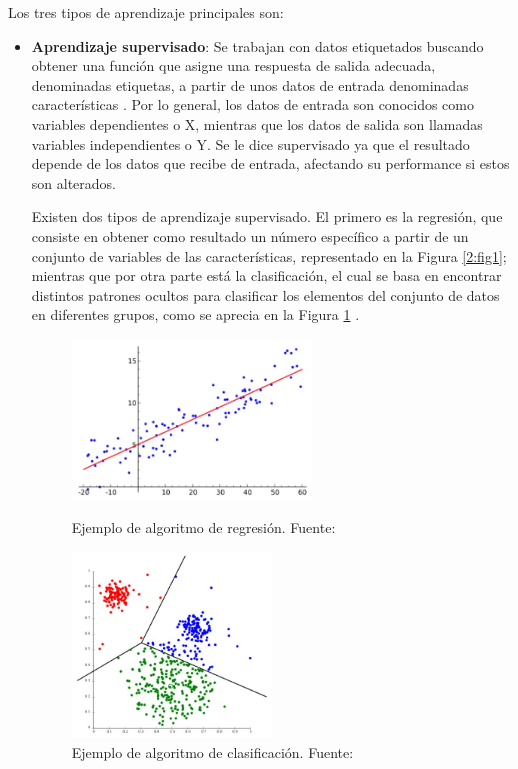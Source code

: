 Los tres tipos de aprendizaje principales son:
\begin{itemize}
	\item \textbf{Aprendizaje supervisado}: Se trabajan con datos etiquetados buscando obtener una función que asigne una respuesta de salida adecuada, denominadas etiquetas, a partir de unos datos de entrada denominadas características \parencite{bk_zambrano2018supnosup}. Por lo general, los datos de entrada son conocidos como variables dependientes o X, mientras que los datos de salida son llamadas variables independientes o Y. Se le dice supervisado ya que el resultado depende de los datos que recibe de entrada, afectando su performance si estos son alterados.
	
	Existen dos tipos de aprendizaje supervisado. El primero es la regresión, que consiste en obtener como resultado un número específico a partir de un conjunto de variables de las características, representado en la Figura \ref{2:fig1}; mientras que por otra parte está la clasificación, el cual se basa en encontrar distintos patrones ocultos para clasificar los elementos del conjunto de datos en diferentes grupos, como se aprecia en la Figura \ref{2:fig2} \parencite{bk_zambrano2018supnosup}.
	\begin{figure}[htbp]
		\begin{center}
			\includegraphics[width=0.6\textwidth]{2/figures/regresion.jpg}
			\caption{Ejemplo de algoritmo de regresión. Fuente: \cite{bk_zambrano2018supnosup}}
			\label{2:fig1}

			\includegraphics[width=0.5\textwidth]{2/figures/clasificacion.jpg}
			\caption{Ejemplo de algoritmo de clasificación. Fuente: \cite{bk_zambrano2018supnosup}}
			\label{2:fig2}
		\end{center}
	\end{figure}
	

\end{itemize}
